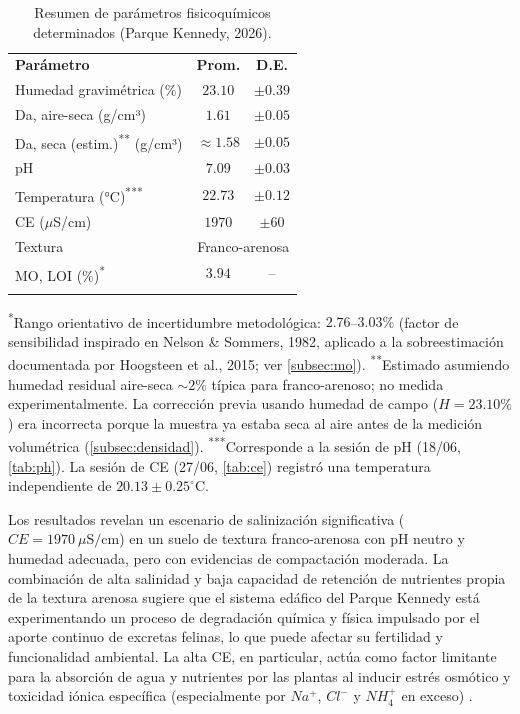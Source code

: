 \documentclass[fleqn]{jaes}
\begin{document}
\begin{table}[htbp]
\centering
\small
\caption{Resumen de parámetros fisicoquímicos determinados (Parque Kennedy, 2026).}\label{tab:resumen_v1}
\begin{tabular}{@{}p{3.6cm}cc@{}}
\toprule
\textbf{Parámetro} & \textbf{Prom.} & \textbf{D.E.} \\
\colrule
Humedad gravimétrica (\%) & $23.10$ & $\pm 0.39$ \\
Da, aire-seca (g/cm³) & $1.61$ & $\pm 0.05$ \\
Da, seca (estim.)\textsuperscript{**} (g/cm³) & $\approx 1.58$ & $\pm 0.05$ \\
pH & $7.09$ & $\pm 0.03$ \\
Temperatura (°C)\textsuperscript{***} & $22.73$ & $\pm 0.12$ \\
CE ($\mu$S/cm) & $1970$ & $\pm 60$ \\
Textura & \multicolumn{2}{c}{Franco-arenosa} \\
MO, LOI (\%)\textsuperscript{*} & $3.94$ & -- \\
\botrule
\end{tabular}
\begin{tabnote}
\textsuperscript{*}Rango orientativo de incertidumbre metodológica: $2.76$--$3.03\%$ (factor de sensibilidad inspirado en Nelson \& Sommers, 1982, aplicado a la sobreestimación documentada por Hoogsteen et al., 2015; ver \cref{subsec:mo}).
\textsuperscript{**}Estimado asumiendo humedad residual aire-seca $\sim 2\%$ típica para franco-arenoso; no medida experimentalmente. La corrección previa usando humedad de campo ($H=23.10\%$) era incorrecta porque la muestra ya estaba seca al aire antes de la medición volumétrica (\cref{subsec:densidad}).
\textsuperscript{***}Corresponde a la sesión de pH (18/06, \cref{tab:ph}). La sesión de CE (27/06, \cref{tab:ce}) registró una temperatura independiente de $20.13 \pm 0.25^\circ\text{C}$.
\end{tabnote}
\end{table}

Los resultados revelan un escenario de salinización significativa ($CE = 1970~\mu\text{S/cm}$) en un suelo de textura franco-arenosa con pH neutro y humedad adecuada, pero con evidencias de compactación moderada. La combinación de alta salinidad y baja capacidad de retención de nutrientes propia de la textura arenosa sugiere que el sistema edáfico del Parque Kennedy está experimentando un proceso de degradación química y física impulsado por el aporte continuo de excretas felinas, lo que puede afectar su fertilidad y funcionalidad ambiental. La alta CE, en particular, actúa como factor limitante para la absorción de agua y nutrientes por las plantas al inducir estrés osmótico y toxicidad iónica específica (especialmente por $Na^+$, $Cl^-$ y $NH_4^+$ en exceso) \cite{Setia2025}.
\end{document}
